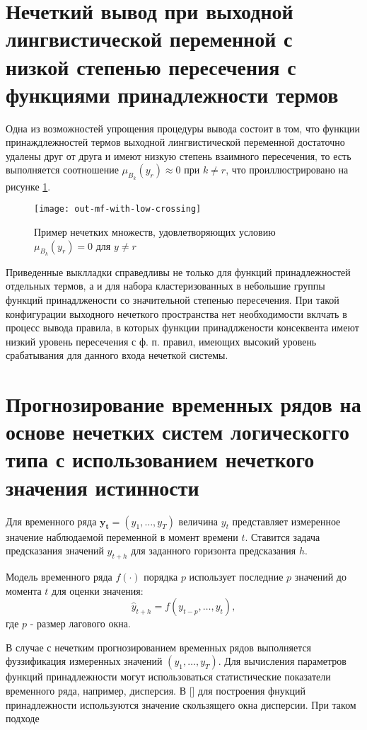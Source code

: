 \section{Нечеткий вывод при выходной лингвистической переменной с низкой степенью пересечения с функциями принадлежности термов}

Одна из возможностей упрощения процедуры вывода состоит в том, что функции принаждлежностей термов выходной лингвистической переменной достаточно удалены друг от друга и имеют низкую степень взаимного пересечения, то есть выполняется соотношение $\mu_{B_k}(y_r) \approx 0$ при $k \ne r$, что проиллюстрировано на рисунке \cref{fig:out-mf-with-low-crossing}.

\begin{figure}[ht]
	\label{fig:out-mf-with-low-crossing}
	\centering
	\texttt{[image: out-mf-with-low-crossing]}
	\caption{Пример нечетких множеств, удовлетворяющих условию $\mu_{B_k}(y_r) = 0$ для $y \ne r$}
\end{figure}

Приведенные выклладки справедливы не только для функций принадлежностей отдельных термов, а и для набора кластеризованных в небольшие группы функций принадлжености со значительной степенью пересечения. При такой конфигурации выходного нечеткого пространства нет необходимости вклчать в процесс вывода правила, в которых функции принадлжености консеквента имеют низкий уровень пересечения с ф. п. правил, имеющих высокий уровень срабатывания для данного входа нечеткой системы.

\section{Прогнозирование временных рядов на основе нечетких систем логическогго типа с использованием нечеткого значения истинности}

Для временного ряда $\mathbf{y_t} = (y_1, \dots, y_T)$ величина $y_t$ представляет измеренное значение наблюдаемой переменной в момент времени $t$. Ставится задача предсказания значений $\hat{y}_{t+h}$ для заданного горизонта предсказания $h$.

Модель временного ряда $f(\cdot)$ порядка $p$ использует последние $p$ значений до момента $t$ для оценки значения:
\[
	\hat{y}_{t+h} = f(y_{t-p}, \dots, y_t),
\]
где $p$ - размер лагового окна.

В случае с нечетким прогнозированием временных рядов выполняется фуззификация измеренных значений $(y_1, \dots, y_T)$. Для вычисления параметров функций принадлежности могут использоваться статистические показатели временного ряда, например, дисперсия. В [] для построения фнукций принадлежности используются значение скользящего окна дисперсии. При таком подходе 

